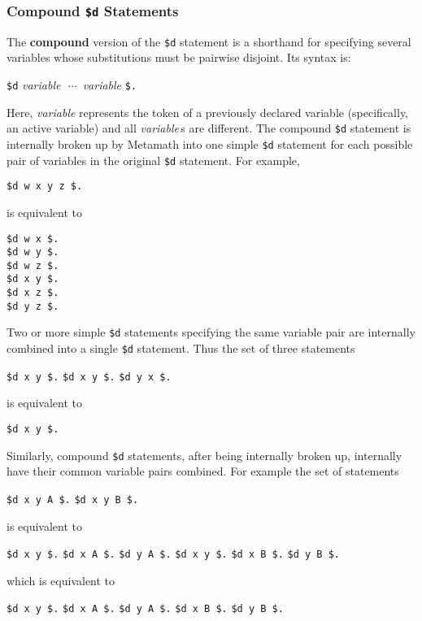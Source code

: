 \subsubsection{Compound \texttt{\$d} Statements}

The {\bf compound} version of the \texttt{\$d} statement is a shorthand for
specifying several variables whose substitutions must be pairwise disjoint.
Its syntax is:
\begin{center}
  \texttt{\$d} {\em variable}\ \,$\cdots$\ {\em variable} \texttt{\$.}
\end{center}
Here, {\em variable} represents the token of a previously declared
variable (specifically, an active variable) and all {\em variable}\,s are
different.  The compound \texttt{\$d}
statement is internally broken up by Metamath into one simple \texttt{\$d}
statement for each possible pair of variables in the original \texttt{\$d}
statement.  For example,
\begin{center}
  \texttt{\$d w x y z \$.}
\end{center}
is equivalent to
\begin{center}
  \texttt{\$d w x \$.}\\
  \texttt{\$d w y \$.}\\
  \texttt{\$d w z \$.}\\
  \texttt{\$d x y \$.}\\
  \texttt{\$d x z \$.}\\
  \texttt{\$d y z \$.}
\end{center}

Two or more simple \texttt{\$d} statements specifying the same variable pair are
internally combined into a single \texttt{\$d} statement.  Thus the set of three
statements
\begin{center}
  \texttt{\$d x y \$.}
  \texttt{\$d x y \$.}
  \texttt{\$d y x \$.}
\end{center}
is equivalent to
\begin{center}
  \texttt{\$d x y \$.}
\end{center}

Similarly, compound \texttt{\$d} statements, after being internally broken up,
internally have their common variable pairs combined.  For example the
set of statements
\begin{center}
  \texttt{\$d x y A \$.}
  \texttt{\$d x y B \$.}
\end{center}
is equivalent to
\begin{center}
  \texttt{\$d x y \$.}
  \texttt{\$d x A \$.}
  \texttt{\$d y A \$.}
  \texttt{\$d x y \$.}
  \texttt{\$d x B \$.}
  \texttt{\$d y B \$.}
\end{center}
which is equivalent to
\begin{center}
  \texttt{\$d x y \$.}
  \texttt{\$d x A \$.}
  \texttt{\$d y A \$.}
  \texttt{\$d x B \$.}
  \texttt{\$d y B \$.}
\end{center}

